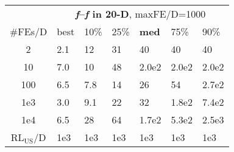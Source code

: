 \begin{tabular}{c|llllll}
 & \multicolumn{6}{|c}{\textbf{\textit{f}\raisebox{-0.35ex}{1}--\textit{f}\raisebox{-0.35ex}{24} in 20-D}, maxFE/D=1000}\\
\#FEs/D & best & 10\% & 25\% & \textbf{med} & 75\% & 90\%\\
2 & \hspace*{1ex}2.1 & 12 & 31 & 40 & 40 & 40\\
10 & \hspace*{1ex}7.0 & 10 & 48 & 2.0e2 & 2.0e2 & 2.0e2\\
100 & \hspace*{1ex}6.5 & \hspace*{1ex}7.8 & 14 & 26 & 54 & 2.7e2\\
1e3 & \hspace*{1ex}3.0 & \hspace*{1ex}9.1 & 22 & 32 & 1.8e2 & 7.4e2\\
1e4 & \hspace*{1ex}6.5 & 28 & 64 & 1.7e2 & 5.3e2 & 2.5e3\\
$\text{RL}_{\text{US}}$/D & 1e3 & 1e3 & 1e3 & 1e3 & 1e3 & 1e3
\end{tabular}
